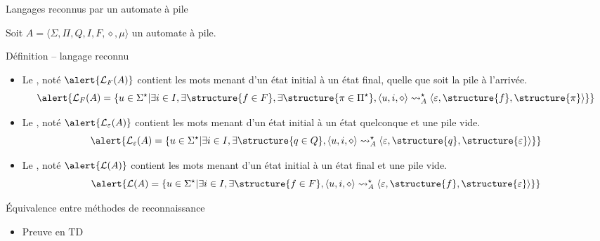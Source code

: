 
\begingroup

\begin{frame}{Langages reconnus par un automate à pile}
  
  Soit $A=\langle \Sigma, \Pi, Q, I, F, \diamond, \mu \rangle$ un automate à pile.

  \begin{block}{Définition -- langage reconnu}
    \begin{itemize}
    \item\vspace{-1mm} Le , noté $\alert{\mathcal{L}_F(A)}$ contient les mots menant d'un état initial à un état final, quelle que soit la pile à l'arrivée. 
      $$\alert{\mathcal{L}_F(A) = \{u \in \Sigma^\star | \exists i\in I, \exists \structure{f\in F}, \exists \structure{\pi\in\Pi^\star}, \langle u, i, \diamond \rangle \leadsto_A^\star \langle \varepsilon, \structure{f}, \structure{\pi} \rangle\}}$$
    \item\vspace{-1mm} Le , noté $\alert{\mathcal{L}_\varepsilon(A)}$ contient les mots menant d'un état initial à un état quelconque et une pile vide. 
      $$
      \alert{\mathcal{L}_\varepsilon(A) = \{u \in \Sigma^\star | \exists i\in I, \exists \structure{q\in Q}, \langle u, i, \diamond \rangle \leadsto_A^\star \langle \varepsilon, \structure{q}, \structure{\varepsilon} \rangle\}}
      $$
    \item\vspace{-1mm} Le , noté $\alert{\mathcal{L}(A)}$ contient les mots menant d'un état initial à un état final et une pile vide. 
      $$
      \alert{\mathcal{L}(A) = \{u \in \Sigma^\star | \exists i\in I, \exists \structure{f\in F}, \langle u, i, \diamond \rangle \leadsto_A^\star \langle \varepsilon, \structure{f}, \structure{\varepsilon} \rangle\}}
      $$
    \end{itemize}
  \end{block}

  \vspace{-2mm}
  \begin{block}{Équivalence entre méthodes de reconnaissance}
    \begin{itemize}
    \item \vspace{-2mm}Preuve en TD
    \end{itemize}
  \end{block}
\end{frame}

\endgroup
